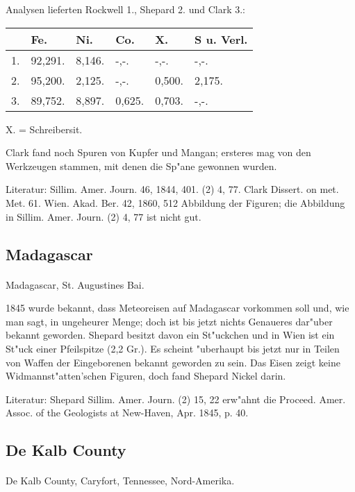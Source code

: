 \documentclass[a4paper, 11pt, oneside]{article}
\begin{document}
Analysen lieferten Rockwell 1., Shepard 2. und Clark 3.:
\begin{table}[H]
    \centering
    \begin{tabular}{l l l l l l}
         & Fe. & Ni. & Co. & X. & S u. Verl. \\ \hline
        1. & 92,291. & 8,146. & -,-. & -,-. & -,-. \\
        2. & 95,200. & 2,125. & -,-. & 0,500. & 2,175. \\
        3. & 89,752. & 8,897. & 0,625. & 0,703. & -,-. \\
    \end{tabular}
\end{table}

X. = Schreibersit.

Clark fand noch Spuren von Kupfer und Mangan; ersteres mag von den Werkzeugen stammen, mit denen die Sp"ane gewonnen wurden.

\footnotesize
Literatur: Sillim. Amer. Journ. 46, 1844, 401. (2) 4, 77. Clark Dissert. on met. Met. 61. Wien. Akad. Ber. 42, 1860, 512 Abbildung der Figuren; die Abbildung in Sillim. Amer. Journ. (2) 4, 77 ist nicht gut.

\subsection{Madagascar}
\normalsize
\paragraph{}
Madagascar, St. Augustines Bai.

1845 wurde bekannt, dass Meteoreisen auf Madagascar vorkommen soll und, wie man sagt, in ungeheurer Menge; doch ist bis jetzt nichts Genaueres dar"uber bekannt geworden. Shepard besitzt davon ein St"uckchen und in Wien ist ein St"uck einer Pfeilspitze (2,2 Gr.). Es scheint "uberhaupt bis jetzt nur in Teilen von Waffen der Eingeborenen bekannt geworden zu sein. Das Eisen zeigt keine Widmannst"atten'schen Figuren, doch fand Shepard Nickel darin.

\footnotesize
Literatur: Shepard Sillim. Amer. Journ. (2) 15, 22 erw"ahnt die Proceed. Amer. Assoc. of the Geologists at New-Haven, Apr. 1845, p. 40.

\subsection{De Kalb County}
\normalsize
\paragraph{}
De Kalb County, Caryfort, Tennessee, Nord-Amerika.
\end{document}
